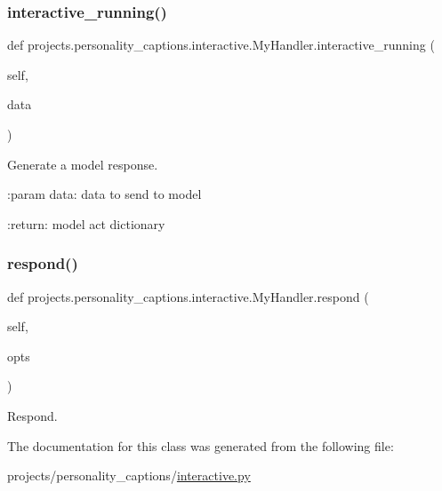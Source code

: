 \subsubsection{\texorpdfstring{interactive\+\_\+running()}{interactive\_running()}}
{\footnotesize\ttfamily def projects.\+personality\+\_\+captions.\+interactive.\+My\+Handler.\+interactive\+\_\+running (\begin{DoxyParamCaption}\item[{}]{self,  }\item[{}]{data }\end{DoxyParamCaption})}

\begin{DoxyVerb}Generate a model response.

:param data:
    data to send to model

:return:
    model act dictionary
\end{DoxyVerb}
 \mbox{\label{classprojects_1_1personality__captions_1_1interactive_1_1MyHandler_a990c770086f0596dde94fc2a84e76d90}} 
\subsubsection{\texorpdfstring{respond()}{respond()}}
{\footnotesize\ttfamily def projects.\+personality\+\_\+captions.\+interactive.\+My\+Handler.\+respond (\begin{DoxyParamCaption}\item[{}]{self,  }\item[{}]{opts }\end{DoxyParamCaption})}

\begin{DoxyVerb}Respond.
\end{DoxyVerb}
 

The documentation for this class was generated from the following file\+:\begin{DoxyCompactItemize}
\item 
projects/personality\+\_\+captions/\hyperlink{projects_2personality__captions_2interactive_8py}{interactive.\+py}\end{DoxyCompactItemize}
